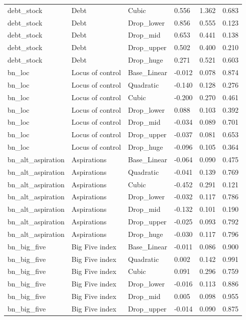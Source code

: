 \begin{tabular}{llllll}
debt\_stock & Debt & Cubic & 0.556 & 1.362 & 0.683 \\
debt\_stock & Debt & Drop\_lower & 0.856 & 0.555 & 0.123 \\
debt\_stock & Debt & Drop\_mid & 0.653 & 0.441 & 0.138 \\
debt\_stock & Debt & Drop\_upper & 0.502 & 0.400 & 0.210 \\
debt\_stock & Debt & Drop\_huge & 0.271 & 0.521 & 0.603 \\
bn\_loc & Locus of control & Base\_Linear & -0.012 & 0.078 & 0.874 \\
bn\_loc & Locus of control & Quadratic & -0.140 & 0.128 & 0.276 \\
bn\_loc & Locus of control & Cubic & -0.200 & 0.270 & 0.461 \\
bn\_loc & Locus of control & Drop\_lower & 0.088 & 0.103 & 0.392 \\
bn\_loc & Locus of control & Drop\_mid & -0.034 & 0.089 & 0.701 \\
bn\_loc & Locus of control & Drop\_upper & -0.037 & 0.081 & 0.653 \\
bn\_loc & Locus of control & Drop\_huge & -0.096 & 0.105 & 0.364 \\
bn\_alt\_aspiration & Aspirations & Base\_Linear & -0.064 & 0.090 & 0.475 \\
bn\_alt\_aspiration & Aspirations & Quadratic & -0.041 & 0.139 & 0.769 \\
bn\_alt\_aspiration & Aspirations & Cubic & -0.452 & 0.291 & 0.121 \\
bn\_alt\_aspiration & Aspirations & Drop\_lower & -0.032 & 0.117 & 0.786 \\
bn\_alt\_aspiration & Aspirations & Drop\_mid & -0.132 & 0.101 & 0.190 \\
bn\_alt\_aspiration & Aspirations & Drop\_upper & -0.025 & 0.093 & 0.792 \\
bn\_alt\_aspiration & Aspirations & Drop\_huge & -0.030 & 0.117 & 0.796 \\
bn\_big\_five & Big Five index & Base\_Linear & -0.011 & 0.086 & 0.900 \\
bn\_big\_five & Big Five index & Quadratic & 0.002 & 0.142 & 0.991 \\
bn\_big\_five & Big Five index & Cubic & 0.091 & 0.296 & 0.759 \\
bn\_big\_five & Big Five index & Drop\_lower & -0.016 & 0.113 & 0.886 \\
bn\_big\_five & Big Five index & Drop\_mid & 0.005 & 0.098 & 0.955 \\
bn\_big\_five & Big Five index & Drop\_upper & -0.014 & 0.090 & 0.875 \\

\end{tabular}
